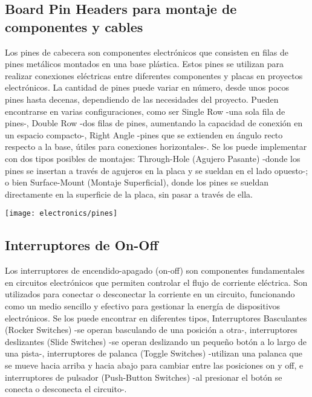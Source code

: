 \subsection{Board Pin Headers para montaje de componentes y cables}
Los pines de cabecera son componentes electrónicos que consisten en filas de pines metálicos montados en una base plástica. Estos pines se utilizan para realizar conexiones eléctricas entre diferentes componentes y placas en proyectos electrónicos. La cantidad de pines puede variar en número, desde unos pocos pines hasta decenas, dependiendo de las necesidades del proyecto. Pueden encontrarse en varias configuraciones, como ser Single Row -una sola fila de pines-, Double Row -dos filas de pines, aumentando la capacidad de conexión en un espacio compacto-, Right Angle -pines que se extienden en ángulo recto respecto a la base, útiles para conexiones horizontales-. Se los puede implementar con dos tipos posibles de montajes: Through-Hole (Agujero Pasante) -donde los pines se insertan a través de agujeros en la placa y se sueldan en el lado opuesto-; o bien Surface-Mount (Montaje Superficial), donde los pines se sueldan directamente en la superficie de la placa, sin pasar a través de ella.

\begin{center}
  \centering
  \texttt{[image: electronics/pines]}
  \label{fig:pines}
\end{center}

\subsection{Interruptores de On-Off}
Los interruptores de encendido-apagado (on-off) son componentes fundamentales en circuitos electrónicos que permiten controlar el flujo de corriente eléctrica. Son utilizados para conectar o desconectar la corriente en un circuito, funcionando como un medio sencillo y efectivo para gestionar la energía de dispositivos electrónicos. Se los puede encontrar en diferentes tipos,     Interruptores Basculantes (Rocker Switches) -se operan basculando de una posición a otra-, interruptores deslizantes (Slide Switches) -se operan deslizando un pequeño botón a lo largo de una pista-, interruptores de palanca (Toggle Switches) -utilizan una palanca que se mueve hacia arriba y hacia abajo para cambiar entre las posiciones on y off, e interruptores de pulsador (Push-Button Switches) -al presionar el botón se conecta o desconecta el circuito-.


